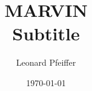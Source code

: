 \documentclass[11pt]{article}
\title{
	\huge MARVIN \\
	\vspace{7pt}
	\Large Subtitle
}
\author{Leonard Pfeiffer}
\date{\today}
\begin{document}
	\maketitle \label{title}
	\newpage
	
	\tableofcontents \label{toc}
	\newpage
\end{document}

